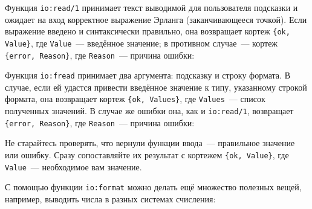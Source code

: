 \documentclass[
  paper=a4,
  fontsize=14pt,
  openany,
  appendixprefix=true
]{scrbook}
\begin{document}
Функция \lstinline{io:read/1} принимает текст выводимой для пользователя подсказки и ожидает на вход корректное выражение Эрланга (заканчивающееся точкой). Если выражение введено и синтаксически правильно, она возвращает кортеж \lstinline!{ok, Value}!, где \lstinline{Value}~--- введённое значение; в противном случае~--- кортеж \lstinline!{error, Reason}!, где \lstinline{Reason}~--- причина ошибки:


Функция \lstinline{io:fread} принимает два аргумента: подсказку и строку формата. В случае, если ей удастся привести введённое значение к типу, указанному строкой формата, она возвращает кортеж \lstinline!{ok, Values}!, где \lstinline{Values}~--- список полученных значений. В случае же ошибки она, как и \lstinline{io:read/1}, возвращает \lstinline!{error, Reason}!, где \lstinline{Reason}~--- причина ошибки:


Не старайтесь проверять, что вернули функции ввода~--- правильное значение или ошибку. Сразу сопоставляйте их результат с кортежем \lstinline!{ok, Value}!, где \lstinline{Value}~--- необходимое вам значение.


С помощью функции \lstinline{io:format} можно делать ещё множество полезных вещей, например, выводить числа в разных системах счисления:
\end{document}
